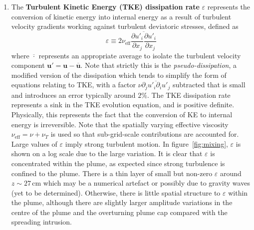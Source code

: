 \documentclass[a4paper]{article}
\begin{document}
\begin{enumerate}[label=(\alph*)]
	\item The \textbf{Turbulent Kinetic Energy (TKE) dissipation rate} $\varepsilon$ represents the conversion
		of kinetic energy into internal energy as a result of turbulent velocity gradients working against
		turbulent deviatoric stresses, defined as
		\begin{equation}
			\varepsilon \equiv 2\nu_{\text{eff}} \overline{\frac{\partial u'_i}{\partial x_j} \frac{\partial
					u'_i}{\partial x_j}}
		\end{equation}
		where $\overline{\cdot}$ represents an appropriate average to isolate the turbulent velocity component
		$\bm{u}' = \bm{u}-\overline{\bm{u}}$. Note that strictly this is the \emph{pseudo-dissipation}, a
		modified version of the dissipation which tends to simplify the form of equations relating to TKE,
		with a factor $\nu \overline{\partial_j u'_i \partial_i u'_j}$ subtracted that is small and introduces
		an error typically around $2\%$. The TKE dissipation rate represents a sink in the TKE evolution
		equation, and is positive definite.  Physically, this represents the fact that the conversion of KE to
		internal energy is irreversible.  Note that the spatially varying effective viscosity
		$\nu_{\text{eff}} = \nu + \nu_T$ is used so that sub-grid-scale contributions are accounted for. Large
		values of $\varepsilon$ imply strong turbulent motion. In figure~\ref{fig:mixing}, $\varepsilon$ is
		shown on a log scale due to the large variation.  It is clear that $\varepsilon$ is concentrated
		within the plume, as expected since strong turbulence is confined to the plume. There is a thin layer
		of small but non-zero $\varepsilon$ around $z \sim 27 \,\mathrm{cm}$ which may be a numerical artefact
		or possibly due to gravity waves (yet to be determined). Otherwise, there is little spatial structure
		to $\varepsilon$ within the plume, although there are slightly larger amplitude variations in the
		centre of the plume and the overturning plume cap compared with the spreading intrusion.


\end{enumerate}
\end{document}
